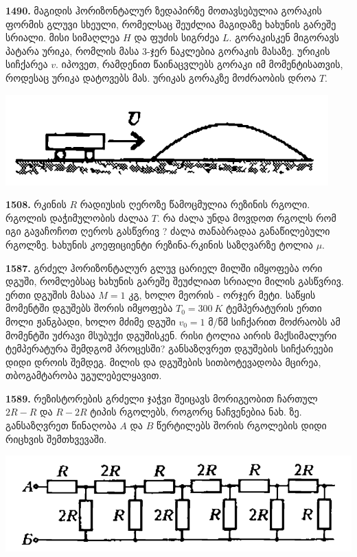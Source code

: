 \documentclass[12pt,a4paper,]{report}
\begin{document}
\textbf{1490.} მაგიდის ჰორიზონტალურ ზედაპირზე მოთავსებულია გორაკის ფორმის გლუვი სხეული, რომელსაც შეუძლია მაგიდაზე ხახუნის გარეშე სრიალი. მისი სიმაღლეა $H$ და ფუძის სიგრძეა $L$. გორაკისკენ მიგორავს პატარა ურიკა, რომლის მასა 3-ჯერ ნაკლებია გორაკის მასაზე. ურიკის სიჩქარეა $v$. იპოვეთ, რამდენით წაინაცვლებს გორაკი  იმ მომენტისათვის, როდესაც ურიკა დატოვებს მას. ურიკას გორაკზე მოძრაობის დროა $T$. 
		\begin{center}
			\includegraphics[scale=0.4]{images/F1490.png}
		\end{center}
	
\textbf{1508.} რკინის $R$ რადიუსის ღეროზე წამოცმულია რეზინის რგოლი. რგოლის დაჭიმულობის ძალაა $T$. რა ძალა უნდა მოვდოთ რგოლს რომ იგი გავაჩოჩოთ ღეროს გასწვრივ ? ძალა თანაბრადაა განაწილებული რგოლზე. ხახუნის კოეფიციენტი რეზინა-რკინის საზღვარზე ტოლია $\mu$. 

\textbf{1587.} გრძელ ჰორიზონტალურ გლუვ ცარიელ მილში იმყოფება ორი დგუში, რომლებსაც ხახუნის გარეშე შეუძლიათ სრიალი მილის გასწვრივ. ერთი დგუშის მასაა $M=1$ კგ, ხოლო მეორის - ორჯერ მეტი. საწყის მომენტში დგუშებს შორის იმყოფება $T_0=300~K$ ტემპერატურის ერთი მოლი ჟანგბადი, ხოლო მძიმე დგუში $v_0=1$ მ/წმ სიჩქარით მოძრაობს ამ მომენტში უძრავი მსუბუქი დგუშისკენ. რისი ტოლია აირის მაქსიმალური ტემპერატურა შემდგომ პროცესში? განსაზღვრეთ დგუშების სიჩქარეები დიდი დროის შემდეგ. მილის და დგუშების სითბოტევადობა მცირეა, თბოგამტარობა უგულებელყავით.

\textbf{1589.} რეზისტორების გრძელი ჯაჭვი შეიცავს მორიგეობით ჩართულ $2R-R$ და $R-2R$ ტიპის რგოლებს, როგორც ნაჩვენებია ნახ. ზე. განსაზღვრეთ წინაღობა $A$ და $B$ წერტილებს შორის რგოლების დიდი რიცხვის შემთხვევაში.  
		\begin{center}
			\includegraphics[scale=0.4]{images/F1589.png}
		\end{center}
\end{document}
